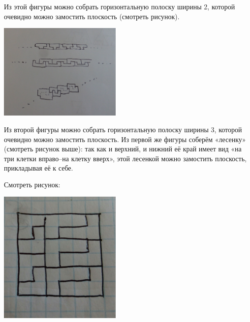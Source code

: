
\begin{itemize}
\itA Из этой фигуры можно собрать горизонтальную полоску ширины 2, которой очевидно можно замостить плоскость (смотреть рисунок).

\begin{center}
	\includegraphics[natwidth=3584,natheight=2820,width=6cm]{figures/2018-plane-park-a}
\end{center}

\itB Из второй фигуры можно собрать горизонтальную полоску ширины 3, которой очевидно можно замостить плоскость. Из первой же фигуры соберём «лесенку» (смотреть рисунок выше): так как и верхний, и нижний её край имеет вид «на три клетки вправо–на клетку вверх», этой лесенкой можно замостить плоскость, прикладывая её к себе.

\itC Смотреть рисунок:
\begin{center}
	\includegraphics[natwidth=1946,natheight=2126,width=6cm]{figures/2018-plane-park-c}
\end{center}
\end{itemize}